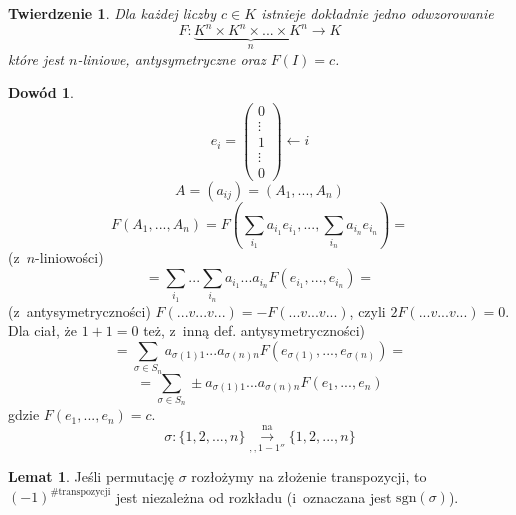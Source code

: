 \documentclass[12pt,a4paper]{article}
\theoremstyle{plain}
\newtheorem{tw}{Twierdzenie}[section]
\theoremstyle{definition}
\theoremstyle{definition}
\theoremstyle{definition}
\theoremstyle{definition}
\newtheorem*{dd}{Dowód}
\theoremstyle{definition}
\newtheorem*{lem}{Lemat}
\theoremstyle{definition}
\theoremstyle{definition}
\theoremstyle{definition}
\theoremstyle{definition}
\begin{document}
\begin{tw}
    Dla każdej liczby $c \in K$ istnieje dokładnie jedno odwzorowanie
    \[F: \underbrace{K^n \times K^n \times ... \times K^n}_{n} \rightarrow K\]
    które jest $n$-liniowe, antysymetryczne oraz $F(I) = c$.
\end{tw}

\begin{dd}
    \[e_i=\begin{pmatrix}0\\ \vdots \\1\\ \vdots \\0\end{pmatrix} \leftarrow i\]
  \[A=(a_{ij})=(A_1, ..., A_n)\]
  \[F(A_1, ..., A_n) = F(\sum_{i_1}a_{i_1}e_{i_1}, ..., \sum_{i_n}a_{i_n}e_{i_n}) =\]
  (z~$n$-liniowości)
  \[= \sum_{i_1}...\sum_{i_n}a_{i_1}...a_{i_n}F(e_{i_1}, ..., e_{i_n}) =\]
  (z~antysymetryczności) $F(...v...v...)=-F(...v...v...)$,
  czyli $2F(...v...v...)=0$. Dla ciał, że $1+1=0$ też, z~inną def. antysymetryczności)
  \[= \sum_{\sigma\in S_n}a_{\sigma(1)1}...a_{\sigma(n)n}F(e_{\sigma(1)}, ..., e_{\sigma(n)}) = \]
  \[= \sum_{\sigma\in S_n} \pm a_{\sigma(1)1}...a_{\sigma(n)n}F(e_1, ..., e_n)\]
  gdzie $F(e_1, ..., e_n)=c$.
  \[\sigma: \{1, 2, ..., n\} \overset{\mathrm{na}}{\underset{\mathrm{,,1-1''}}{\longrightarrow}} \{1, 2, ..., n\}\]

\end{dd}

\begin{lem}
    Jeśli permutację $\sigma$ rozłożymy na złożenie transpozycji, to $(-1)^{\#\mathrm{transpozycji}}$ jest niezależna od rozkładu (i~oznaczana jest $\mathrm{sgn}(\sigma)$).
\end{lem}
\end{document}
